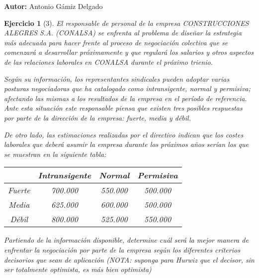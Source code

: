 \documentclass[12pt]{article}
\newtheorem*{ejercicio*}{Ejercicio}
\theoremstyle{definition}
\theoremstyle{remark}
\begin{document}
\textbf{Autor:} Antonio Gámiz Delgado

\begin{ejercicio*}[3]
El responsable de personal de la empresa CONSTRUCCIONES ALEGRES S.A. (CONALSA) se enfrenta al problema de diseñar la estrategia más adecuada para hacer frente al proceso de negociación colectiva que se comenzará a desarrollar próximamente y que regulará los salarios y otros aspectos de las relaciones laborales en CONALSA durante el próximo trienio.

Según su información, los representantes sindicales pueden adoptar varias posturas negociadoras que ha catalogado como intransigente, normal y permisiva; afectando las mismas a los resultados de la empresa en el período de referencia. Ante esta situación este responsable piensa que existen tres posibles respuestas por parte de la dirección de la empresa: fuerte, media y débil.

De otro lado, las estimaciones realizadas por el directivo indican que los costes laborales que deberá asumir la empresa durante los próximos años serían los que se muestran en la siguiente tabla:
\begin{center}

\begin{tabular}{|c|c|c|c|}
\hline 
 & Intransigente & Normal& Permisiva\\ 
\hline 
Fuerte & 700.000 & 550.000 & 500.000 \\ 
\hline 
Media & 625.000 & 600.000 & 500.000 \\ 
\hline 
Débil & 800.000 & 525.000 & 550.000 \\ 
\hline 
\end{tabular} 
\end{center}

Partiendo de la información disponible, determine cuál será la mejor manera de enfrentar la negociación por parte de la empresa según los diferentes criterios decisorios que sean de aplicación (NOTA: suponga para Hurwiz que el decisor, sin ser totalmente optimista, es más bien optimista)

\end{ejercicio*}
\end{document}
